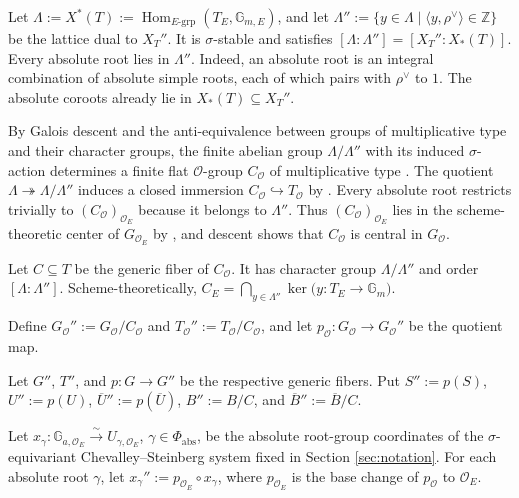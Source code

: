 \documentclass[12pt]{article}
\numberwithin{equation}{section}
\theoremstyle{definition}
\theoremstyle{remark}
\theoremstyle{plain}
\begin{document}
Let $\Lambda:=X^*(T):=\operatorname{Hom}_{E\text{-grp}}(T_E,\mathbb G_{m,E})$, and let $\Lambda'':=\{y\in\Lambda\mid \langle y,\rho^\vee\rangle\in\mathbb Z\}$ be the lattice dual to $X_T''$. It is $\sigma$-stable and satisfies $[\Lambda:\Lambda'']=[X_T'':X_*(T)]$.
Every absolute root lies in $\Lambda''$. Indeed, an absolute root is an integral combination of absolute simple roots, each of which pairs with $\rho^\vee$ to $1$. The absolute coroots already lie in $X_*(T)\subseteq X_T''$.

By Galois descent and the anti-equivalence between groups of multiplicative type and their character groups, the finite abelian group $\Lambda/\Lambda''$ with its induced $\sigma$-action determines a finite flat $\mathcal O$-group $C_{\mathcal O}$ of multiplicative type \cite[Proposition B.3.4]{ConradRGS}. The quotient $\Lambda\twoheadrightarrow\Lambda/\Lambda''$ induces a closed immersion $C_{\mathcal O}\hookrightarrow T_{\mathcal O}$ by \cite[Lemma B.1.3]{ConradRGS}. Every absolute root restricts trivially to $(C_{\mathcal O})_{\mathcal O_E}$ because it belongs to $\Lambda''$. Thus $(C_{\mathcal O})_{\mathcal O_E}$ lies in the scheme-theoretic center of $G_{\mathcal O_E}$ by \cite[Example 5.1.7]{ConradRGS}, and descent shows that $C_{\mathcal O}$ is central in $G_{\mathcal O}$.

Let $C\subseteq T$ be the generic fiber of $C_{\mathcal O}$. It has character group $\Lambda/\Lambda''$ and order $[\Lambda:\Lambda'']$. Scheme-theoretically, $C_E=\bigcap_{y\in\Lambda''}\ker\bigl(y:T_E\to\mathbb G_m\bigr)$.

Define $G_{\mathcal O}'':=G_{\mathcal O}/C_{\mathcal O}$ and $T_{\mathcal O}'':=T_{\mathcal O}/C_{\mathcal O}$, and let $p_{\mathcal O}:G_{\mathcal O}\to G_{\mathcal O}''$ be the quotient map.

Let $G''$, $T''$, and $p:G\to G''$ be the respective generic fibers. Put $S'':=p(S)$, $U'':=p(U)$, $\overline U'':=p(\overline U)$, $B'':=B/C$, and $\overline B'':=\overline B/C$.

Let $x_\gamma:\mathbb G_{a,\mathcal O_E}\xrightarrow{\sim}U_{\gamma,\mathcal O_E}$, $\gamma\in\Phi_{\mathrm{abs}}$, be the absolute root-group coordinates of the $\sigma$-equivariant Chevalley--Steinberg system fixed in Section \ref{sec:notation}. For each absolute root $\gamma$, let $x_\gamma'':=p_{\mathcal O_E}\circ x_\gamma$, where $p_{\mathcal O_E}$ is the base change of $p_{\mathcal O}$ to $\mathcal O_E$.
\end{document}
